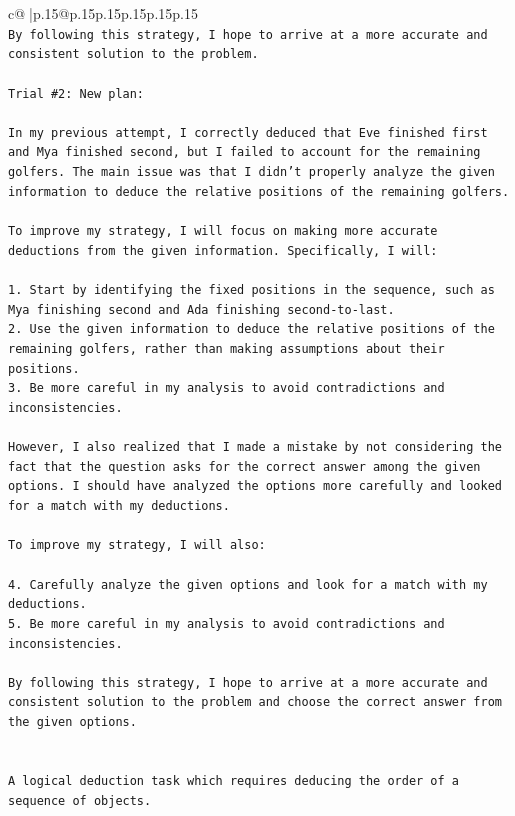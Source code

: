 \documentclass{article}
\begin{document}
{\begin{supertabular}{c@{$\;$}|p{.15\linewidth}@{}p{.15\linewidth}p{.15\linewidth}p{.15\linewidth}p{.15\linewidth}p{.15\linewidth}}
{{{\\ 
\texttt{By following this strategy, I hope to arrive at a more accurate and consistent solution to the problem.} \\
\\ 
\texttt{Trial \#2: New plan: } \\
\\ 
\texttt{In my previous attempt, I correctly deduced that Eve finished first and Mya finished second, but I failed to account for the remaining golfers. The main issue was that I didn't properly analyze the given information to deduce the relative positions of the remaining golfers.} \\
\\ 
\texttt{To improve my strategy, I will focus on making more accurate deductions from the given information. Specifically, I will:} \\
\\ 
\texttt{1. Start by identifying the fixed positions in the sequence, such as Mya finishing second and Ada finishing second{-}to{-}last.} \\
\texttt{2. Use the given information to deduce the relative positions of the remaining golfers, rather than making assumptions about their positions.} \\
\texttt{3. Be more careful in my analysis to avoid contradictions and inconsistencies.} \\
\\ 
\texttt{However, I also realized that I made a mistake by not considering the fact that the question asks for the correct answer among the given options. I should have analyzed the options more carefully and looked for a match with my deductions.} \\
\\ 
\texttt{To improve my strategy, I will also:} \\
\\ 
\texttt{4. Carefully analyze the given options and look for a match with my deductions.} \\
\texttt{5. Be more careful in my analysis to avoid contradictions and inconsistencies.} \\
\\ 
\texttt{By following this strategy, I hope to arrive at a more accurate and consistent solution to the problem and choose the correct answer from the given options.} \\
\\ 
\\ 
\texttt{A logical deduction task which requires deducing the order of a sequence of objects.} \\
}}}
\end{supertabular}}
\end{document}
